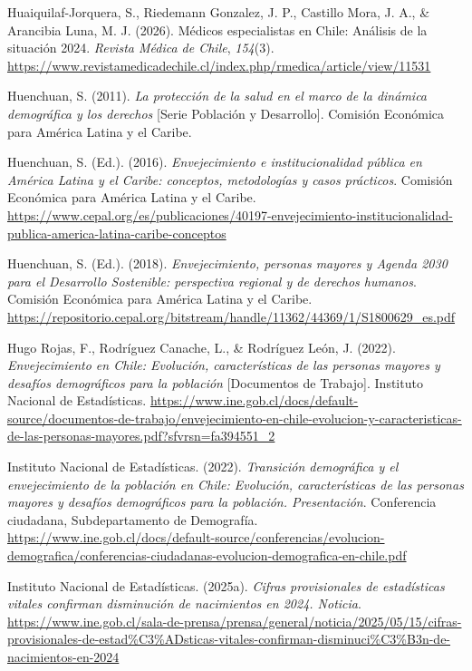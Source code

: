 \documentclass[
  spanish,
  a4paper,
  oneside]{scrbook}
\newlength{\cslhangindent}
\newenvironment{CSLReferences}[2] %
 {\begin{list}{}{%
  \setlength{\itemindent}{0pt}
  \setlength{\leftmargin}{0pt}
  \setlength{\parsep}{0pt}
  \ifodd #1
   \setlength{\leftmargin}{\cslhangindent}
   \setlength{\itemindent}{-1\cslhangindent}
  \fi
  \setlength{\itemsep}{#2\baselineskip}}}
 {\end{list}}
\begin{document}
\begin{CSLReferences}{1}{0}
Huaiquilaf-Jorquera, S., Riedemann Gonzalez, J. P., Castillo Mora, J.
A., \& Arancibia Luna, M. J. (2026). Médicos especialistas en Chile:
Análisis de la situación 2024. \emph{Revista Médica de Chile},
\emph{154}(3).
\url{https://www.revistamedicadechile.cl/index.php/rmedica/article/view/11531}

Huenchuan, S. (2011). \emph{La protección de la salud en el marco de la
dinámica demográfica y los derechos} {[}Serie Población y Desarrollo{]}.
Comisión Económica para América Latina y el Caribe.

Huenchuan, S. (Ed.). (2016). \emph{Envejecimiento e institucionalidad
pública en América Latina y el Caribe: conceptos, metodologías y casos
prácticos}. Comisión Económica para América Latina y el Caribe.
\url{https://www.cepal.org/es/publicaciones/40197-envejecimiento-institucionalidad-publica-america-latina-caribe-conceptos}

Huenchuan, S. (Ed.). (2018). \emph{Envejecimiento, personas mayores y
Agenda 2030 para el Desarrollo Sostenible: perspectiva regional y de
derechos humanos}. Comisión Económica para América Latina y el Caribe.
\url{https://repositorio.cepal.org/bitstream/handle/11362/44369/1/S1800629_es.pdf}

Hugo Rojas, F., Rodríguez Canache, L., \& Rodríguez León, J. (2022).
\emph{Envejecimiento en Chile: Evolución, características de las
personas mayores y desafíos demográficos para la población}
{[}Documentos de Trabajo{]}. Instituto Nacional de Estadísticas.
\url{https://www.ine.gob.cl/docs/default-source/documentos-de-trabajo/envejecimiento-en-chile-evolucion-y-caracteristicas-de-las-personas-mayores.pdf?sfvrsn=fa394551_2}

Instituto Nacional de Estadísticas. (2022). \emph{Transición demográfica
y el envejecimiento de la población en Chile: Evolución, características
de las personas mayores y desafíos demográficos para la población.
Presentación}. Conferencia ciudadana, Subdepartamento de Demografía.
\url{https://www.ine.gob.cl/docs/default-source/conferencias/evolucion-demografica/conferencias-ciudadanas-evolucion-demografica-en-chile.pdf}

Instituto Nacional de Estadísticas. (2025a). \emph{Cifras provisionales
de estadísticas vitales confirman disminución de nacimientos en 2024.
Noticia}.
\url{https://www.ine.gob.cl/sala-de-prensa/prensa/general/noticia/2025/05/15/cifras-provisionales-de-estad\%C3\%ADsticas-vitales-confirman-disminuci\%C3\%B3n-de-nacimientos-en-2024}


\end{CSLReferences}
\end{document}
